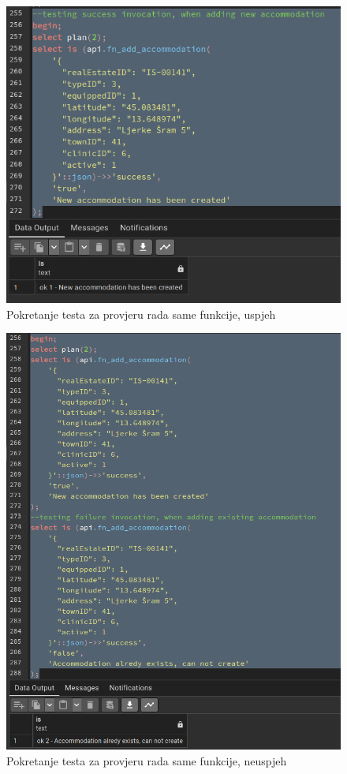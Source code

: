 				\begin{figure}[H]
					\centering
					\includegraphics[width=\textwidth]{slike/unit_tests/ut_4/success_invocation.png}
					\caption{Pokretanje testa za provjeru rada same funkcije, uspjeh}
					\label{fig: IS4-uspješno kreiran smještaj}
				\end{figure}
				\begin{figure}[H]
					\centering
					\includegraphics[width=\textwidth]{slike/unit_tests/ut_4/failure_invocation.png}
					\caption{Pokretanje testa za provjeru rada same funkcije, neuspjeh}
					\label{fig: IS4-smještaj nije kreiran, već postoji isti}
				\end{figure}

